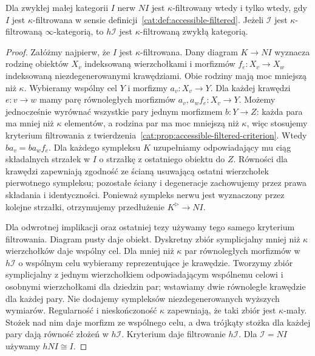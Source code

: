 \begin{stwierdzenie}\label{cat:prop:infty-filtered-ordinary}
Dla zwykłej małej kategorii $I$ nerw $NI$ jest $\kappa$-filtrowany wtedy i tylko wtedy, gdy $I$ jest $\kappa$-filtrowana w sensie definicji~\ref{cat:def:accessible-filtered}. Jeżeli $\mathcal I$ jest $\kappa$-filtrowaną $\infty$-kategorią, to $h\mathcal I$ jest $\kappa$-filtrowaną zwykłą kategorią.
\end{stwierdzenie}
\begin{proof}
Załóżmy najpierw, że $I$ jest $\kappa$-filtrowana. Dany diagram $K\to NI$ wyznacza rodzinę obiektów $X_v$ indeksowaną wierzchołkami i morfizmów $f_e:X_v\to X_w$ indeksowaną niezdegenerowanymi krawędziami. Obie rodziny mają moc mniejszą niż $\kappa$. Wybieramy wspólny cel $Y$ i morfizmy $a_v:X_v\to Y$. Dla każdej krawędzi $e:v\to w$ mamy parę równoległych morfizmów $a_v,a_wf_e:X_v\to Y$. Możemy jednocześnie wyrównać wszystkie pary jednym morfizmem $b:Y\to Z$: każda para ma mniej niż $\kappa$ elementów, a rodzina par ma moc mniejszą niż $\kappa$, więc stosujemy kryterium filtrowania z twierdzenia~\ref{cat:prop:accessible-filtered-criterion}. Wtedy $ba_v=ba_wf_e$. Dla każdego sympleksu $K$ uzupełniamy odpowiadający mu ciąg składalnych strzałek w $I$ o strzałkę z ostatniego obiektu do $Z$. Równości dla krawędzi zapewniają zgodność ze ścianą usuwającą ostatni wierzchołek pierwotnego sympleksu; pozostałe ściany i degeneracje zachowujemy przez prawa składania i identyczności. Ponieważ sympleks nerwu jest wyznaczony przez kolejne strzałki, otrzymujemy przedłużenie $K^{\triangleright}\to NI$.

Dla odwrotnej implikacji oraz ostatniej tezy używamy tego samego kryterium filtrowania. Diagram pusty daje obiekt. Dyskretny zbiór symplicjalny mniej niż $\kappa$ wierzchołków daje wspólny cel. Dla mniej niż $\kappa$ par równoległych morfizmów w $h\mathcal I$ o wspólnym celu wybieramy reprezentujące je krawędzie. Tworzymy zbiór symplicjalny z jednym wierzchołkiem odpowiadającym wspólnemu celowi i osobnymi wierzchołkami dla dziedzin par; wstawiamy dwie równoległe krawędzie dla każdej pary. Nie dodajemy sympleksów niezdegenerowanych wyższych wymiarów. Regularność i nieskończoność $\kappa$ zapewniają, że taki zbiór jest $\kappa$-mały. Stożek nad nim daje morfizm ze wspólnego celu, a dwa trójkąty stożka dla każdej pary dają równość złożeń w $h\mathcal I$. Kryterium daje filtrowanie $h\mathcal I$. Dla $\mathcal I=NI$ używamy $hNI\cong I$.
\end{proof}

